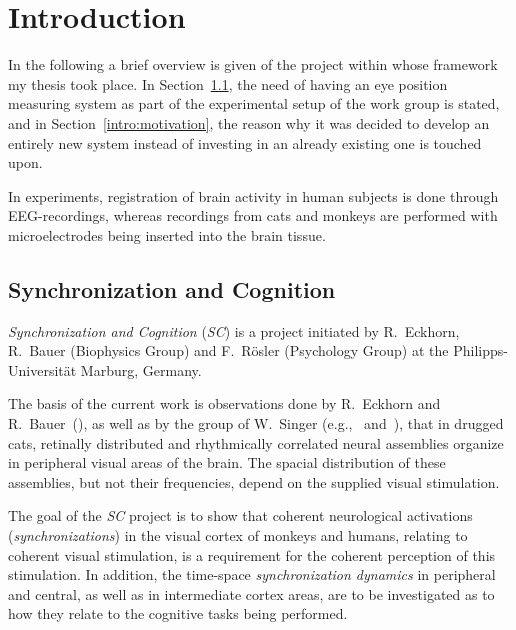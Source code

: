 
\chapter{Introduction}
\label{intro}

In the following a brief overview is given of the project within whose
framework my thesis took place.  In Section~\ref{intro:synch}, the
need of having an eye position measuring system as part of the
experimental setup of the work group is stated, and in
Section~\ref{intro:motivation}, the reason why it was decided to
develop an entirely new system instead of investing in an already
existing one is touched upon.

In experiments, registration of brain activity in human subjects is
done through EEG-recordings, whereas recordings from cats and monkeys
are performed with microelectrodes being inserted into the brain
tissue.

\section{Synchronization and Cognition}
\label{intro:synch}

{\em Synchronization and Cognition\/} ({\em SC\/}) is a project
initiated by R.\ Eckhorn, R.\ Bauer (Biophysics Group) and F.\
R\"{o}sler (Psychology Group) at the
Philipps-Universit\"{a}t Marburg, Germany.

The basis of the current work is observations done by R.\ Eckhorn and
R.\ Bauer~(\cite{cat1}), as well as by the group of W.\ Singer
(e.g.,~\cite{cat3} and~\cite{cat2}), that in drugged cats,
retinally distributed and
rhythmically correlated neural assemblies organize in peripheral
visual areas of the brain.  The spacial distribution of these
assemblies, but not their frequencies, depend on the supplied visual
stimulation.

The goal of the {\em SC\/} project is to show that coherent
neurological activations ({\em synchronizations\/}) in the visual
cortex of monkeys and humans, relating to coherent visual stimulation,
is a requirement for the coherent perception of this stimulation.  In
addition, the time-space {\em synchronization dynamics\/} in
peripheral and central, as well as in intermediate cortex areas, are
to be investigated as to how they relate to the cognitive tasks being
performed.

